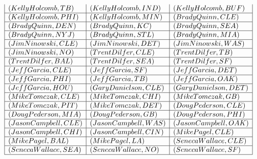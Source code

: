 \documentclass{ximera}
\begin{document}
\begin{center}
\[\begin{array}{|l|l|l|}
(Kelly Holcomb, TB) & (Kelly Holcomb, IND) & (Kelly Holcomb, BUF) \\\hline 


(Kelly Holcomb, PHI) & (Kelly Holcomb, MIN) & (Brady Quinn, CLE) \\\hline 


(Brady Quinn, DEN) & (Brady Quinn, KC) &  (Brady Quinn, SEA) \\\hline 


(Brady Quinn, NYJ) & (Brady Quinn, STL) & (Brady Quinn, MIA) \\\hline 


(Jim Ninowski, CLE) & (Jim Ninowski, DET) & (Jim Ninowski, WAS) \\\hline 


(Jim Ninowski, NO) & (Trent Dilfer, CLE) & (Trent Dilfer, TB) \\\hline  


(Trent Dilfer, BAL) &  (Trent Dilfer, SEA) &  (Trent Dilfer, SF) \\\hline 


(Jeff Garcia, CLE) & (Jeff Garcia, SF) & (Jeff Garcia, DET) \\\hline 


(Jeff Garcia, PHI) & (Jeff Garcia, TB) & (Jeff Garcia, OAK) \\\hline 


(Jeff Garcia, HOU) & (Gary Danielson, CLE) & (Gary Danielson, DET) \\\hline 


(Mike Tomczak, CLE) & (Mike Tomczak, CHI) & (Mike Tomczak, GB) \\\hline 


(Mike Tomczak, PIT) & (Mike Tomczak, DET) & (Doug Pederson, CLE) \\\hline 


(Doug Pederson, MIA) & (Doug Pederson, GB) & (Doug Pederson, PHI) \\\hline 


(Jason Campbell, CLE) & (Jason Campbell, WAS) & (Jason Campbell, OAK) \\\hline 


(Jason Campbell, CHI) & (Jason Campbell, CIN) & (Mike Pagel, CLE) \\\hline 


(Mike Pagel, BAL) & (Mike Pagel, LA) & (Seneca Wallace, CLE) \\\hline 


(Seneca Wallace, SEA) &  (Seneca Wallace, NO) &  (Seneca Wallace, SF) \\\hline  



\end{array}\]
\end{center}
\end{document}

